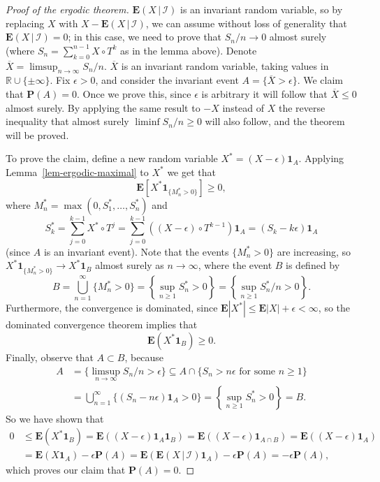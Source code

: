 \documentclass[12pt]{article}
\newcommand{\R}{\mathbb{R}}
\newcommand{\prob}{\mathbf{P}}
\newcommand{\expec}{\mathbf{E}}
\newcommand{\condexp}[2]{\expec\left(#1\,|\,#2\right)}
\newcommand{\ind}{\textbf{1}}
\theoremstyle{example}
\begin{document}
\begin{proof}[Proof of the ergodic theorem]
$\condexp{X}{\mathcal{I}}$ is an invariant random variable, so by replacing $X$ with $X-\condexp{X}{\mathcal{I}}$, we can assume without loss of generality that $\condexp{X}{\mathcal{I}}=0$; in this case, we need to prove that $S_n/n\to 0$ almost surely (where $S_n=\sum_{k=0}^{n-1} X\circ T^k$ as in the lemma above). Denote $\overline{X} = \limsup_{n\to\infty} S_n/n$. $\overline{X}$ is an invariant random variable, taking values in $\R\cup\{\pm\infty\}$. Fix $\epsilon>0$, and consider the invariant event $A= \{ \overline{X} > \epsilon \}$. We claim that $\prob(A)=0$. Once we prove this, since $\epsilon$ is arbitrary it will follow that $\overline{X}\le 0$ almost surely. By applying the same result to $-X$ instead of $X$ the reverse inequality that almost surely $\liminf S_n/n\ge 0$ will also follow, and the theorem will be proved.

To prove the claim, define a new random variable $X^* = (X-\epsilon)\ind_{A}$. Applying Lemma~\ref{lem-ergodic-maximal} to $X^*$ we get that
$$ \expec\left[X^* \ind_{\{ M_n^*>0\}}\right] \ge 0, $$
where $M_n^* = \max(0,S_1^*,\ldots,S_n^*)$ and
$$
S_k^* = \sum_{j=0}^{k-1} X^*\circ T^j = \sum_{j=0}^{k-1} \left((X-\epsilon)\circ T^{k-1}\right) \ind_A = (S_k-k\epsilon)\ind_A
$$
(since $A$ is an invariant event).
Note that the events $\{M_n^* > 0\}$ are increasing, so $X^* \ind_{\{ M_n^*>0\}} \to X^* \ind_B$ almost surely as $n\to\infty$, where the event $B$ is defined by
$$B=\bigcup_{n=1}^\infty \{M_n^* > 0 \} = 
\left\{ \sup_{n\ge 1} S_n^* > 0 \right\}
= \left\{ \sup_{n\ge 1} S_n^*/n > 0 \right\}.
$$
Furthermore, the convergence is dominated, since $\expec|X^*| \le \expec|X|+\epsilon<\infty$, so the dominated convergence theorem implies that
$$ \expec(X^* \ind_B) \ge 0. $$
Finally, observe that $A\subset B$, because
\begin{align*}
A&=\{\limsup_{n\to\infty} S_n/n>\epsilon\} \subseteq A \cap \{ S_n>n\epsilon \textrm{ for some }n\ge 1\}
\\ &= \bigcup_{n=1}^\infty \{ (S_n-n\epsilon)\ind_A > 0 \} = \left\{ \sup_{n\ge 1} S_n^*>0 \right\} = B. 
\end{align*}
So we have shown that
\begin{align*}
0 &\le \expec(X^*\ind_B) = \expec((X-\epsilon)\ind_A \ind_B) = 
\expec((X-\epsilon)\ind_{A\cap B} ) = \expec((X-\epsilon)\ind_A ) \\&= 
\expec(X\ind_A) - \epsilon \prob(A)
= \expec(\condexp{X}{\mathcal{I}}\ind_A) - \epsilon \prob(A) = -\epsilon \prob(A), 
\end{align*}
which proves our claim that $\prob(A)=0$.
\end{proof}
\end{document}
